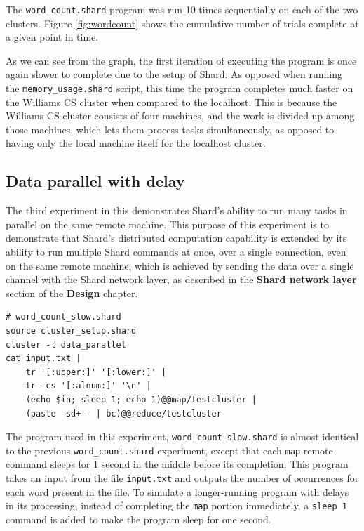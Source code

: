 \documentclass[oneside]{report}
\begin{document}
The \texttt{word\_count.shard} program was run 10 times sequentially on each of the two clusters.
Figure \ref{fig:wordcount} shows the cumulative number of trials complete at a given point in time.

As we can see from the graph, the first iteration of executing the program is once again slower to complete due to the setup of Shard.
As opposed when running the \texttt{memory\_usage.shard} script, this time the program completes much faster on the Williams CS cluster when compared to the localhost.
This is because the Williams CS cluster consists of four machines, and the work is divided up among those machines, which lets them process tasks simultaneously, as opposed to having only the local machine itself for the localhost cluster.

\subsection{Data parallel with delay}
The third experiment in this demonstrates Shard's ability to run many tasks in parallel on the same remote machine.
This purpose of this experiment is to demonstrate that Shard's distributed computation capability is extended by its ability to run multiple Shard commands at once, over a single connection, even on the same remote machine, which is achieved by sending the data over a single channel with the Shard network layer, as described in the \textbf{Shard network layer} section of the \textbf{Design} chapter.

\begin{minipage}[c]{\textwidth-15pt}
  \begin{lstlisting}[language=Shard]
# word_count_slow.shard
source cluster_setup.shard
cluster -t data_parallel
cat input.txt |
    tr '[:upper:]' '[:lower:]' |
    tr -cs '[:alnum:]' '\n' |
    (echo $in; sleep 1; echo 1)@@map/testcluster |
    (paste -sd+ - | bc)@@reduce/testcluster
\end{lstlisting}
  \smallskip
\end{minipage}

The program used in this experiment, \texttt{word\_count\_slow.shard} is almost identical to the previous \texttt{word\_count.shard} experiment, except that each \texttt{map} remote command sleeps for 1 second in the middle before its completion.
This program takes an input from the file \texttt{input.txt} and outputs the number of occurrences for each word present in the file.
To simulate a longer-running program with delays in its processing, instead of completing the \texttt{map} portion immediately, a \texttt{sleep 1} command is added to make the program sleep for one second.
\end{document}
